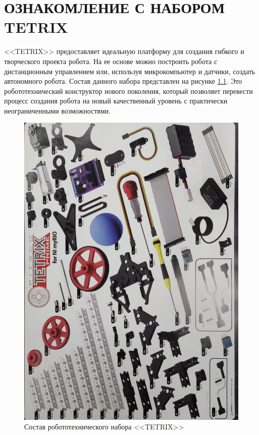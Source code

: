 \chapter{ОЗНАКОМЛЕНИЕ С НАБОРОМ TETRIX}
<<TETRIX>> предоставляет идеальную платформу для создания гибкого
и творческого проекта робота. На ее основе можно построить робота
с дистанционным управлением или, используя микрокомпьютер
и датчики, создать автономного робота. Состав данного набора
представлен на рисунке \ref{fig:all}.
Это робототехнический конструктор
нового поколения, который позволяет перевести процесс создания робота
на новый качественный уровень с практически неограниченными возможностями.
\\
\begin{figure}[hb]
    \centering
    \includegraphics[scale=0.35]{fig/2.1.jpg}
    \caption{Состав робототехнического набора <<TETRIX>>}
    \label{fig:all}
\end{figure}

